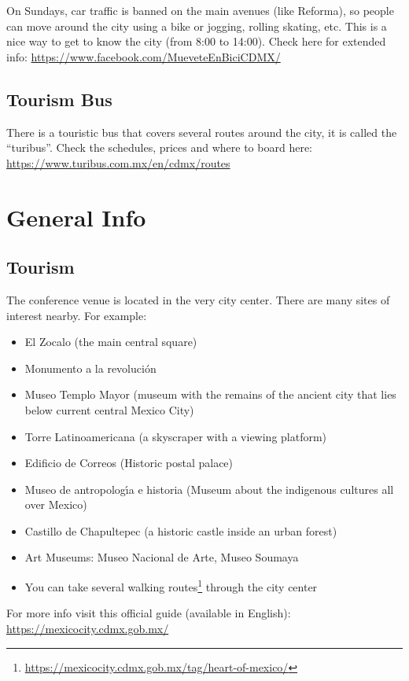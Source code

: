 On Sundays, car traffic is banned on the main avenues (like Reforma), so people can move around the city using a bike or jogging, rolling skating, etc. This is a nice way to get to know the city (from 8:00 to 14:00).
Check here for extended info: \url{https://www.facebook.com/MueveteEnBiciCDMX/}

\subsection*{Tourism Bus}
There is a touristic bus that covers several routes around the city, it is called the ``turibus''. Check the schedules, prices and where to board here: \url{https://www.turibus.com.mx/en/cdmx/routes}


\section*{General Info}

\subsection*{Tourism}
The conference venue is located in the very city center. There are many sites of interest nearby. For example:
\begin{itemize}
  \setlength\parskip{0em}
  \setlength\itemsep{0.3em}
\item El Zocalo (the main central square)
\item Monumento a la revoluci\'on
\item Museo Templo Mayor (museum with the remains of the ancient city that lies below current central Mexico City)
\item Torre Latinoamericana (a skyscraper with a viewing platform)
\item Edificio de Correos (Historic postal palace)
\item Museo de antropolog\'{\i}a e historia (Museum about the indigenous cultures all over Mexico)
\item Castillo de Chapultepec (a historic castle inside an urban forest)
\item  Art Museums: Museo Nacional de Arte, Museo Soumaya
\item You can take several walking routes\footnote{\url{https://mexicocity.cdmx.gob.mx/tag/heart-of-mexico/}} through the city center
\end{itemize}
For more info visit this official guide (available in English): \url{https://mexicocity.cdmx.gob.mx/}

